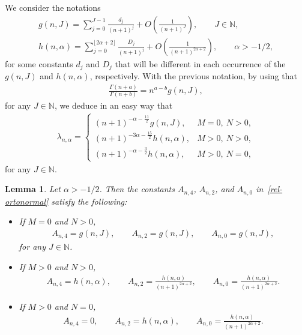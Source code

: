 \documentclass[pdftex]{sigma}
\newtheorem{lem}[thm]{Lemma}
\numberwithin{equation}{section}
\begin{document}
We consider the notations
\begin{gather*}%
g(n,J)=\sum_{j=0}^{J-1}\frac{d_j}{(n+1)^{j}}+O\left(\frac{1}{(n+1)^J}\right), \qquad J\in \mathbb{N},\\
h(n,\alpha)=\sum_{j=0}^{\lfloor 2\alpha+2 \rfloor}\frac{D_j}{(n+1)^{j}}+O\left(\frac{1}{(n+1)^{2\alpha+2}}\right), \qquad \alpha>-1/2,
\end{gather*}
for some constants $d_j$ and $D_j$ that will be different in each occurrence of the $g(n,J)$ and $h(n,\alpha)$, respectively. With the previous notation, by using that
\begin{gather}\label{ec:gamma-ratio}
\frac{\Gamma(n+a)}{\Gamma(n+b)}=n^{a-b}g(n,J),
\end{gather}
for any $J\in \mathbb{N}$, we deduce in an easy way that
\begin{gather}\label{lambda_n}
\lambda_{n,\alpha}= \begin{cases}
(n+1)^{-\alpha-\frac{11}{2}}g(n,J), & M=0, \ N>0,\\
(n+1)^{-3\alpha-\frac{15}{2}}h(n,\alpha), & M>0, \ N>0,\\
(n+1)^{-\alpha-\frac{3}{2}}h(n,\alpha), & M>0, \ N=0,
\end{cases}
\end{gather}
for any $J\in \mathbb{N}$.

\begin{lem}\label{A_nB_nC_n} Let $\alpha>-1/2$. Then the constants $A_{n,4}$, $A_{n,2}$, and $A_{n,0}$ in~\eqref{rel-ortonormal} satisfy the following:
	\begin{itemize}\itemsep=0pt
		\item [$i)$] If $M=0$ and $N>0$,
		\begin{gather*}
		A_{n,4}=g(n,J),\qquad A_{n,2}= g(n,J),\qquad A_{n,0}= g(n,J),
		\end{gather*}
for any $J\in \mathbb{N}$.
		\item [$ii)$] If $M>0$ and $N>0$,
		\begin{gather*}
		A_{n,4}= h(n,\alpha),\qquad A_{n,2}=\frac{h(n,\alpha)}{(n+1)^{2\alpha+2}},\qquad A_{n,0}=\frac{h(n,\alpha)}{(n+1)^{2\alpha+2}}.
		\end{gather*}
		\item [$iii)$] If $M>0$ and $N=0$,
		\begin{gather*}
		A_{n,4}=0,\qquad A_{n,2}=h(n,\alpha),\qquad A_{n,0}=\frac{h(n,\alpha)}{(n+1)^{2\alpha+2}}.
		\end{gather*}
	\end{itemize}
\end{lem}
\end{document}
